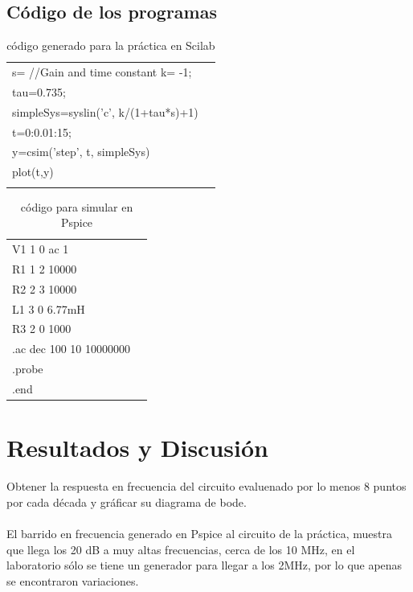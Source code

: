 \documentclass[12pt,letterpaper]{article}     %
\begin{document}

\subsection{Código de los programas}
\begin{table}[htbp]
\begin{center}
\begin{tabular}{|l|l|}
\hline
s=%
//Gain and time constant
k= -1;\\
tau=0.735;\\
simpleSys=syslin('c', k/(1+tau*s)+1)\\
t=0:0.01:15;\\
y=csim('step', t, simpleSys)\\
plot(t,y)\\
\\
\hline 

\end{tabular}
\caption{código generado para la práctica en Scilab}
\label{cód1}
\end{center}
\end{table}
\begin{table}[htb]
\begin{center}
\begin{tabular}{|l|l|}
\hline
V1 1 0 ac 1\\
R1 1 2 10000\\
R2 2 3 10000\\
L1 3 0 6.77mH\\
R3 2 0 1000\\
.ac dec 100 10 10000000\\
.probe\\
.end\\
\hline 

\end{tabular}
\caption{código para simular en Pspice}
\label{cód2}
\end{center}
\end{table}
\newpage
\section{Resultados y Discusión}
Obtener la respuesta en frecuencia del circuito evaluenado por lo menos 8 puntos por cada década y gráficar su diagrama de bode.\\\\
El barrido en frecuencia generado en Pspice al circuito de la práctica, muestra que llega los 20 dB a muy altas frecuencias, cerca de los 10 MHz, en el laboratorio sólo se tiene un generador para llegar a los 2MHz, por lo que apenas se encontraron variaciones.\\\\\
\end{document}
